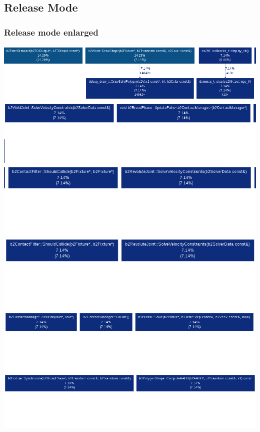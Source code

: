 \documentclass[11pt]{article}
\begin{document}
\subsection*{Release Mode}

\subsubsection*{Release mode enlarged}
\includegraphics[scale=0.30]{./images/rcall1.png}
\includegraphics[scale=0.30]{./images/rcall2.png}
\includegraphics[scale=0.30]{./images/rcall3.png}
\includegraphics[scale=0.30]{./images/rcall4.png}
\includegraphics[scale=0.30]{./images/rcall5.png}
\includegraphics[scale=0.30]{./images/rcall6.png}
\end{document}

